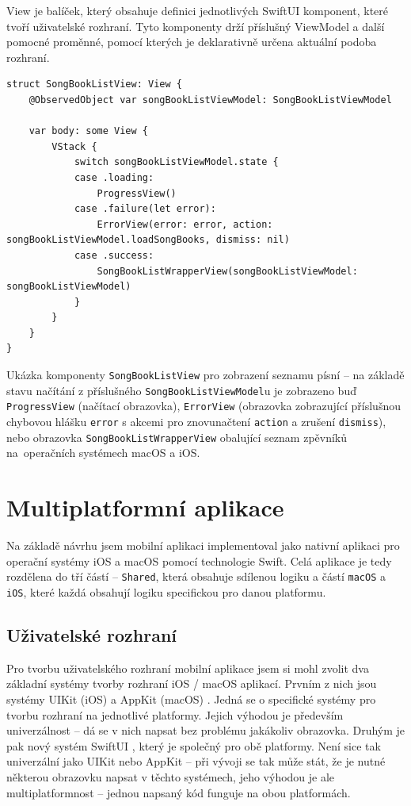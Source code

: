 View je balíček, který obsahuje definici jednotlivých SwiftUI komponent, které tvoří uživatelské rozhraní. Tyto komponenty drží příslušný ViewModel a další pomocné proměnné, pomocí kterých je deklarativně určena aktuální podoba rozhraní.

\begin{listing}[H]
\begin{verbatim}
struct SongBookListView: View {
    @ObservedObject var songBookListViewModel: SongBookListViewModel

    var body: some View {
        VStack {
            switch songBookListViewModel.state {
            case .loading:
                ProgressView()
            case .failure(let error):
                ErrorView(error: error, action: songBookListViewModel.loadSongBooks, dismiss: nil)
            case .success:
                SongBookListWrapperView(songBookListViewModel: songBookListViewModel)
            }
        }
    }
}
\end{verbatim}
\caption[Ukázka komponenty pro zobrazení seznamu písní v aplikaci]{Ukázka komponenty \texttt{SongBookListView} pro zobrazení seznamu písní -- na základě stavu načítání z příslušného \texttt{SongBookListViewModel}u je zobrazeno buď \texttt{ProgressView} (načítací obrazovka), \texttt{ErrorView} (obrazovka zobrazující příslušnou chybovou hlášku \texttt{error} s akcemi pro znovunačtení \texttt{action} a zrušení \texttt{dismiss}), nebo obrazovka \texttt{SongBookListWrapperView} obalující seznam zpěvníků na~operačních systémech macOS a iOS.}
\end{listing}

\section{Multiplatformní aplikace}

Na základě návrhu jsem mobilní aplikaci implementoval jako nativní aplikaci pro operační systémy iOS a macOS pomocí technologie Swift. Celá aplikace je tedy rozdělena do tří částí -- \texttt{Shared}, která obsahuje sdílenou logiku a částí \texttt{macOS} a \texttt{iOS}, které každá obsahují logiku specifickou pro danou platformu.

\subsection{Uživatelské rozhraní}

Pro tvorbu uživatelského rozhraní mobilní aplikace jsem si mohl zvolit dva základní systémy tvorby rozhraní iOS / macOS aplikací. Prvním z nich jsou systémy UIKit (iOS) \cite{uikit} a AppKit (macOS) \cite{appkit}. Jedná se o specifické systémy pro tvorbu rozhraní na jednotlivé platformy. Jejich výhodou je především univerzálnost -- dá se v nich napsat bez problému jakákoliv obrazovka. Druhým je pak nový systém SwiftUI \cite{swiftui}, který je společný pro obě platformy. Není sice tak univerzální jako UIKit nebo AppKit -- při vývoji se tak může stát, že je nutné některou obrazovku napsat v těchto systémech, jeho výhodou je ale multiplatformnost -- jednou napsaný kód funguje na obou platformách.

